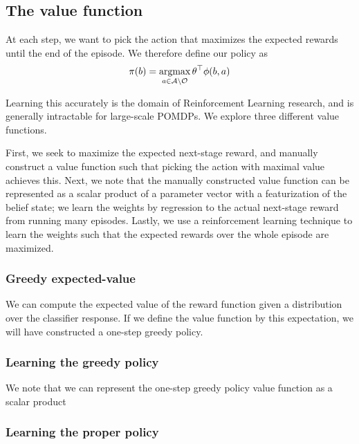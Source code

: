 \documentclass[runningheads]{llncs}
\begin{document}

\subsection{The value function} \label{sec:value}
At each step, we want to pick the action that maximizes the expected rewards until the end of the episode.
We therefore define our policy as
\begin{equation}
\pi(b) = \argmax_{a \in \mathcal{A} \setminus \mathcal{O}} \theta^\top \phi(b,a)
\end{equation}

Learning this accurately is the domain of Reinforcement Learning research, and is generally intractable for large-scale POMDPs.
We explore three different value functions.

First, we seek to maximize the expected next-stage reward, and manually construct a value function such that picking the action with maximal value achieves this.
Next, we note that the manually constructed value function can be represented as a scalar product of a parameter vector with a featurization of the belief state; we learn the weights by regression to the actual next-stage reward from running many episodes.
Lastly, we use a reinforcement learning technique to learn the weights such that the expected rewards over the whole episode are maximized.

\subsubsection{Greedy expected-value}
We can compute the expected value of the reward function given a distribution over the classifier response.
If we define the value function by this expectation, we will have constructed a one-step greedy policy.


\subsubsection{Learning the greedy policy}
We note that we can represent the one-step greedy policy value function as a scalar product 

\subsubsection{Learning the proper policy}
\end{document}
